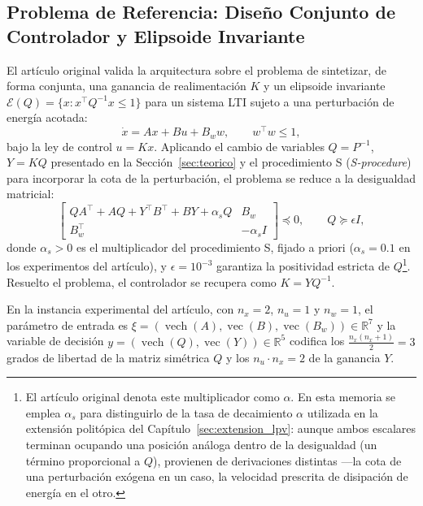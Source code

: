 \subsection{Problema de Referencia: Diseño Conjunto de Controlador y Elipsoide 
Invariante}
\label{subsec:problema_referencia_lti}

El artículo original valida la arquitectura sobre el problema de sintetizar, de forma 
conjunta, una ganancia de realimentación $K$ y un elipsoide invariante 
$\mathcal{E}(Q) = \{x : x^\top Q^{-1} x \le 1\}$ para un sistema LTI sujeto a una 
perturbación de energía acotada:
\begin{equation}
    \dot{x} = Ax + Bu + B_w w, \qquad w^\top w \le 1,
    \label{eq:sistema_lti_perturbado}
\end{equation}
bajo la ley de control $u = Kx$. Aplicando el cambio de variables $Q = P^{-1}$, 
$Y = KQ$ presentado en la Sección~\ref{sec:teorico} y el procedimiento S 
(\textit{S-procedure}) para incorporar la cota de la perturbación, el problema se 
reduce a la desigualdad matricial:
\begin{equation}
    \begin{bmatrix}
        QA^\top + AQ + Y^\top B^\top + BY + \alpha_s Q & B_w \\
        B_w^\top & -\alpha_s I
    \end{bmatrix} \preceq 0,
    \qquad Q \succeq \epsilon I,
    \label{eq:lmi_conjunta_lti}
\end{equation}
donde $\alpha_s > 0$ es el multiplicador del procedimiento S, fijado a priori 
($\alpha_s = 0.1$ en los experimentos del artículo), y $\epsilon = 10^{-3}$ garantiza 
la positividad estricta de $Q$\footnote{El artículo original denota este multiplicador 
como $\alpha$. En esta memoria se emplea $\alpha_s$ para distinguirlo de la tasa de 
decaimiento $\alpha$ utilizada en la extensión politópica del 
Capítulo~\ref{sec:extension_lpv}: aunque ambos escalares terminan ocupando una posición 
análoga dentro de la desigualdad (un término proporcional a $Q$), provienen de 
derivaciones distintas ---la cota de una perturbación exógena en un caso, la velocidad 
prescrita de disipación de energía en el otro.}. Resuelto el problema, el controlador 
se recupera como $K = YQ^{-1}$.

En la instancia experimental del artículo, con $n_x = 2$, $n_u = 1$ y $n_w = 1$, el 
parámetro de entrada es $\xi = (\operatorname{vech}(A), \operatorname{vec}(B), 
\operatorname{vec}(B_w)) \in \mathbb{R}^7$ y la variable de decisión 
$y = (\operatorname{vech}(Q), \operatorname{vec}(Y)) \in \mathbb{R}^5$ codifica los 
$\frac{n_x(n_x+1)}{2} = 3$ grados de libertad de la matriz simétrica $Q$ y los 
$n_u \cdot n_x = 2$ de la ganancia $Y$.












